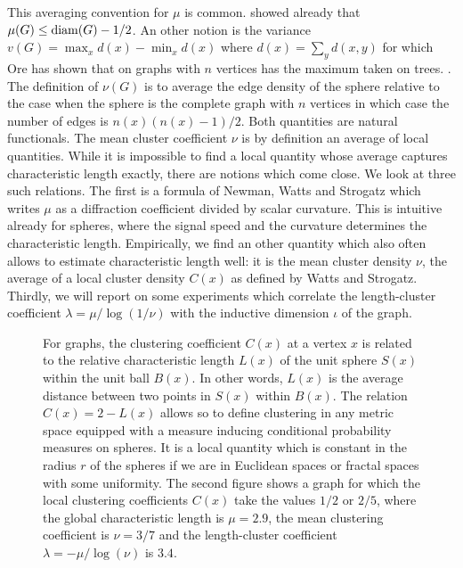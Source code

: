 \documentclass[12pt]{amsart}
\theoremstyle{definition}
\begin{document}
This averaging convention for $\mu$ is common. \cite{DoyleGraver1} showed already that
$\mu(G) \leq {\rm diam}(G)-1/2$. An other notion is the variance $v(G) = \max_x d(x) - \min_x d(x)$
where $d(x)=\sum_y d(x,y)$ for which Ore has shown that on graphs with $n$ vertices
has the maximum taken on trees. \cite{EntringerJacksonSnyder}. 
The definition of $\nu(G)$ is to average the edge density of the sphere relative to the case 
when the sphere is the complete graph with $n$ vertices in which case the number 
of edges is $n(x)(n(x)-1)/2$. Both quantities are natural functionals. The
mean cluster coefficient $\nu$ is by definition an average of local quantities. 
While it is impossible to find a local quantity whose average captures
characteristic length exactly, there are notions which come close. We look at three such 
relations. The first is a formula of Newman, Watts and Strogatz \cite{NewmanStrogatzWatts} 
which writes $\mu$ as a diffraction coefficient divided by scalar curvature.
This is intuitive already for spheres, where the signal speed and the curvature determines
the characteristic length. Empirically, we find an other quantity which also often allows to estimate
characteristic length well: it is the mean cluster density $\nu$, the average of a 
local cluster density $C(x)$ as defined by Watts and Strogatz. Thirdly, we will report on 
some experiments which correlate the length-cluster coefficient $\lambda = \mu/\log(1/\nu)$ 
with the inductive dimension $\iota$ of the graph. \\

\begin{figure}{
\caption{
For graphs, the clustering coefficient $C(x)$ at a vertex $x$ is related to the relative 
characteristic length $L(x)$ of the unit sphere $S(x)$ within the unit ball $B(x)$. 
In other words, $L(x)$ is the average distance between two points in $S(x)$ within $B(x)$. 
The relation $C(x) = 2-L(x)$ allows so to define clustering in any metric space equipped
with a measure inducing conditional probability measures on spheres. It is 
a local quantity which is constant in the radius $r$ of the spheres if we are in 
Euclidean spaces or fractal spaces with some uniformity.
The second figure shows a graph for which the local clustering coefficients $C(x)$ take the 
values $1/2$ or $2/5$, where the global characteristic length is $\mu=2.9$, 
the mean clustering coefficient is $\nu=3/7$ and
the length-cluster coefficient $\lambda=-\mu/\log(\nu)$ is $3.4$. }
\label{clustering}
}
\end{figure}
\end{document}
